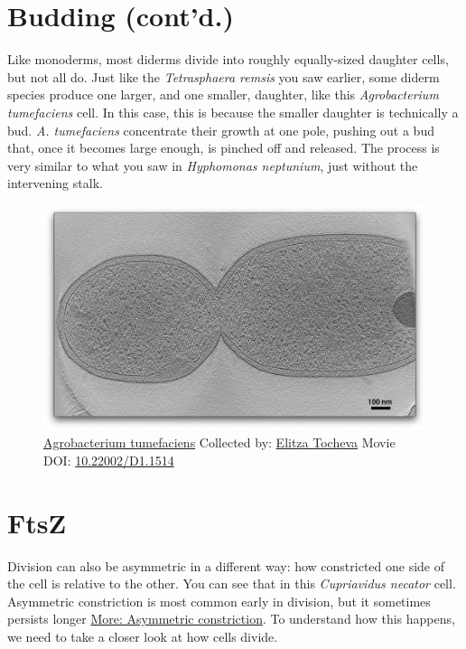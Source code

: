 \documentclass[]{tufte-book}
\begin{document}
\section{Budding (cont'd.)}\label{budding-contd.}

Like monoderms, most diderms divide into roughly equally-sized daughter
cells, but not all do. Just like the \emph{Tetrasphaera remsis} you saw
earlier, some diderm species produce one larger, and one smaller,
daughter, like this \emph{Agrobacterium tumefaciens} cell. In this case,
this is because the smaller daughter is technically a bud. \emph{A.
tumefaciens} concentrate their growth at one pole, pushing out a bud
that, once it becomes large enough, is pinched off and released. The
process is very similar to what you saw in \emph{Hyphomonas neptunium},
just without the intervening stalk.





\begin{figure}
\includegraphics{movie_stills/5_8} \caption[\protect\hyperlink{tree}{Agrobacterium tumefaciens} Collected
by: \protect\hyperlink{elitza_tocheva}{Elitza Tocheva} Movie DOI:
\href{https://doi.org/10.22002/D1.1514}{10.22002/D1.1514}]{\protect\hyperlink{tree}{Agrobacterium tumefaciens} Collected
by: \protect\hyperlink{elitza_tocheva}{Elitza Tocheva} Movie DOI:
\href{https://doi.org/10.22002/D1.1514}{10.22002/D1.1514}}\label{fig:5-8}
\end{figure}

\section{FtsZ}\label{ftsz}

Division can also be asymmetric in a different way: how constricted one
side of the cell is relative to the other. You can see that in this
\emph{Cupriavidus necator} cell. Asymmetric constriction is most common
early in division, but it sometimes persists longer
\protect\hyperlink{Asymmetric_constriction}{More: Asymmetric
constriction}. To understand how this happens, we need to take a closer
look at how cells divide.
\end{document}
